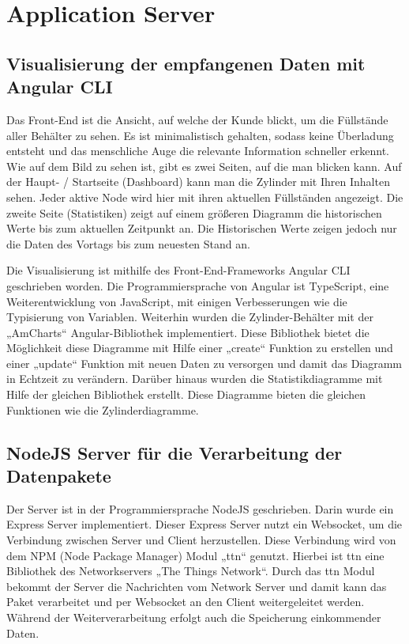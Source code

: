 \chapter{Application Server}
\section{Visualisierung der empfangenen Daten mit Angular CLI}
Das Front-End ist die Ansicht, auf welche der Kunde blickt, um die Füllstände aller Behälter zu sehen. Es ist minimalistisch gehalten, sodass keine Überladung entsteht und das menschliche Auge die relevante Information schneller erkennt. \\

Wie auf dem Bild zu sehen ist, gibt es zwei Seiten, auf die man blicken kann. Auf der Haupt- / Startseite (Dashboard) kann man die Zylinder mit Ihren Inhalten sehen. Jeder aktive Node wird hier mit ihren aktuellen Füllständen angezeigt. Die zweite Seite (Statistiken) zeigt auf einem größeren Diagramm die historischen Werte bis zum aktuellen Zeitpunkt an. Die Historischen Werte zeigen jedoch nur die Daten des Vortags bis zum neuesten Stand an. 

Die Visualisierung ist mithilfe des Front-End-Frameworks Angular CLI geschrieben worden. Die Programmiersprache von Angular ist TypeScript, eine Weiterentwicklung von JavaScript, mit einigen Verbesserungen wie die Typisierung von Variablen. Weiterhin wurden die Zylinder-Behälter mit der „AmCharts“ Angular-Bibliothek implementiert. Diese Bibliothek bietet die Möglichkeit diese Diagramme mit Hilfe einer „create“ Funktion zu erstellen und einer „update“ Funktion mit neuen Daten zu versorgen und damit das Diagramm in Echtzeit zu verändern. Darüber hinaus wurden die Statistikdiagramme mit Hilfe der gleichen Bibliothek erstellt. Diese Diagramme bieten die gleichen Funktionen wie die Zylinderdiagramme.

\section{NodeJS Server für die Verarbeitung der Datenpakete}
Der Server ist in der Programmiersprache NodeJS geschrieben. Darin wurde ein Express Server implementiert. Dieser Express Server nutzt ein Websocket, um die Verbindung zwischen Server und Client herzustellen. Diese Verbindung wird von dem NPM (Node Package Manager) Modul „ttn“ genutzt. Hierbei ist ttn eine Bibliothek des Networkservers „The Things Network“. Durch das ttn Modul bekommt der Server die Nachrichten vom Network Server und damit kann das Paket verarbeitet und per Websocket an den Client weitergeleitet werden. Während der Weiterverarbeitung erfolgt auch die Speicherung einkommender Daten.

